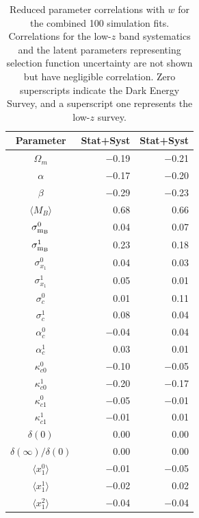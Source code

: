 \documentclass[a4paper,fleqn,usenatbib]{emulateapj}
\newcommand{\gten}{\citetalias{Guy2010}}
\newcommand{\celeven}{\citetalias{Chotard2011}}
\begin{document}
\begin{table}
	\centering
	\caption{Reduced parameter correlations with $w$ for the combined 100 simulation fits. Correlations for the low-$z$ band systematics and the latent parameters representing selection function uncertainty are not shown but have negligible correlation. Zero superscripts indicate the Dark Energy Survey, and a superscript one represents the low-$z$ survey.}
	\label{tab:parameter_correlations}
	\begin{tabular}{c|rr}
		Parameter & {\gten} Stat+Syst & {\celeven} Stat+Syst  \\
		\hline
		$\Omega_m$ &   $-$0.19 &     $-$0.21     \\
		$\alpha$ &   $-$0.17 &     $-$0.20     \\
		$\beta$ &   $-$0.29 &     $-$0.23     \\
		$\langle M_B \rangle$ &    0.68 &      0.66     \\
		$\sigma_{\rm m_B}^{0}$ &    0.04 &      0.07     \\
		$\sigma_{\rm m_B}^{1}$ &    0.23 &      0.18     \\
		$\sigma_{x_1}^{0}$ &    0.04 &      0.03     \\
		$\sigma_{x_1}^{1}$ &    0.05 &      0.01     \\
		$\sigma_{c}^{0}$ &    0.01 &      0.11     \\
		$\sigma_{c}^{1}$ &    0.08 &      0.04     \\
		$\alpha_c^{0}$ &   $-$0.04 &      0.04     \\
		$\alpha_c^{1}$ &    0.03 &      0.01     \\
		$\kappa_{c0}^{0}$ &   $-$0.10 &     $-$0.05     \\
		$\kappa_{c0}^{1}$ &   $-$0.20 &     $-$0.17     \\
		$\kappa_{c1}^{0}$ &   $-$0.05 &     $-$0.01     \\
		$\kappa_{c1}^{1}$ &   $-$0.01 &      0.01     \\
		$\delta(0)$ &    0.00 &      0.00     \\
		$\delta(\infty)/\delta(0)$ &    0.00 &      0.00     \\
		$\langle x_1^{0} \rangle$ &   $-$0.01 &     $-$0.05     \\
		$\langle x_1^{1} \rangle$ &   $-$0.02 &      0.02     \\
		$\langle x_1^{2} \rangle$ &   $-$0.04 &     $-$0.04     \\

\end{tabular}
\end{table}
\end{document}
